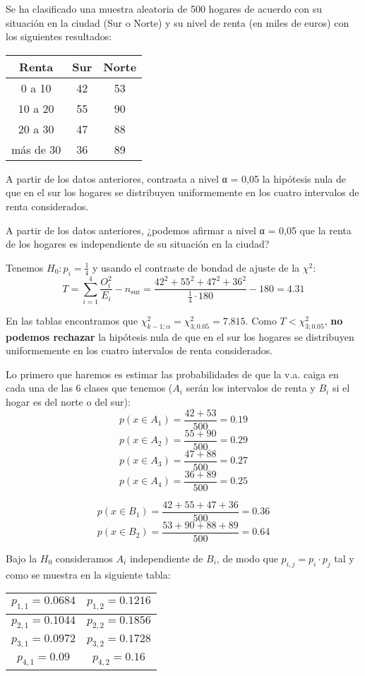 \newpage
\begin{problem}[8] Se ha clasificado una muestra aleatoria de 500 hogares de acuerdo con su situación en la ciudad
(Sur o Norte) y su nivel de renta (en miles de euros) con los siguientes resultados:
\begin{center}
	\begin{tabular}{c c c}
		\hline
		Renta & Sur & Norte\\ \hline
		0 a 10 & 42 & 53 \\
		10 a 20 & 55 & 90 \\
		20 a 30 & 47 & 88 \\
		más de 30 & 36 & 89\\ \hline
	\end{tabular}
\end{center}

\ppart
A partir de los datos anteriores, contrasta a nivel α = 0,05 la hipótesis nula de que en el sur los
hogares se distribuyen uniformemente en los cuatro intervalos de renta considerados.

\ppart
A partir de los datos anteriores, ¿podemos afirmar a nivel α = 0,05 que la renta de los hogares
es independiente de su situación en la ciudad?
\solution


\spart
Tenemos $H_0: p_i=\frac{1}{4}$ y usando el contraste de bondad de ajuste de la $χ^2$:
\[T = \sum_{i=1}^4 \frac{O_i^2}{E_i} - n_{\text{sur}} = \frac{42^2 + 55^2 + 47^2 + 36^2}{\frac{1}{4}·180} - 180 = 4.31\]

En las tablas encontramos que $χ^2_{k-1;α} = χ^2_{3;0.05} = 7.815$. Como $T<χ^2_{3;0.05}$, \textbf{no podemos rechazar} la hipótesis nula de que en el sur los hogares se distribuyen uniformemente en los cuatro intervalos de renta considerados.

\spart
Lo primero que haremos es estimar las probabilidades de que la v.a. caiga en cada una de las 6 clases que tenemos ($A_i$ serán los intervalos de renta y $B_i$ si el hogar es del norte o del sur):
\[p(x∈A_1) = \frac{42+53}{500} = 0.19\]
\[p(x∈A_2) = \frac{55+90}{500} = 0.29\]
\[p(x∈A_3) = \frac{47+88}{500} = 0.27\]
\[p(x∈A_4) = \frac{36+89}{500} = 0.25\]

\[p(x∈B_1) = \frac{42+55+47+36}{500} = 0.36\]
\[p(x∈B_2) = \frac{53+90+88+89}{500} = 0.64\]

Bajo la $H_0$ consideramos $A_i$ independiente de $B_i$, de modo que $p_{i,j} = p_i·p_j$ tal y como se muestra en la siguiente tabla:

\begin{center}
	\begin{tabular}{c | c}
		$p_{1,1} = 0.0684$ & $p_{1,2} = 0.1216$\\ \hline
		$p_{2,1} = 0.1044$ & $p_{2,2} = 0.1856$\\ \hline
		$p_{3,1} = 0.0972$ & $p_{3,2} = 0.1728$\\ \hline
		$p_{4,1} = 0.09$ & $p_{4,2} = 0.16$
	\end{tabular}
\end{center}


\end{problem}

